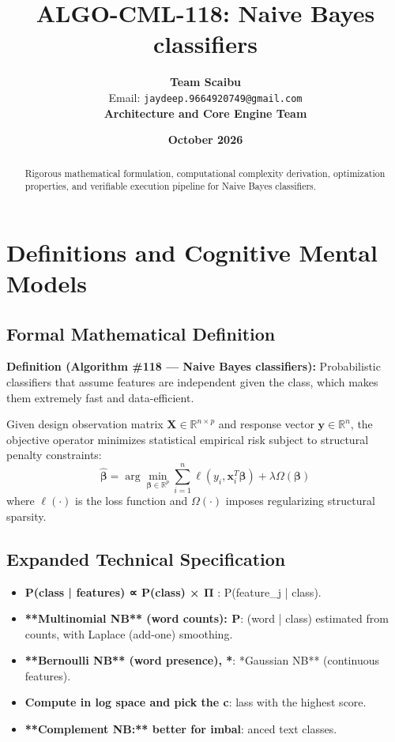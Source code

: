 \documentclass[11pt,a4paper]{article}
\title{\textbf{ALGO-CML-118: Naive Bayes classifiers}}
\author{\textbf{Team Scaibu} \\ \small Email: \texttt{jaydeep.9664920749@gmail.com} \\ \small \textbf{Architecture and Core Engine Team}}
\date{\textbf{October 2026}}
\theoremstyle{definition}
\begin{document}
\maketitle

\begin{abstract}
Rigorous mathematical formulation, computational complexity derivation, optimization properties, and verifiable execution pipeline for Naive Bayes classifiers.
\end{abstract}

\section{Definitions and Cognitive Mental Models}

\subsection{Formal Mathematical Definition}
\textbf{Definition (Algorithm \#118 --- Naive Bayes classifiers):}
Probabilistic classifiers that assume features are independent given the class, which makes them extremely fast and data-efficient.

Given design observation matrix $\mathbf{X} \in \mathbb{R}^{n \times p}$ and response vector $\mathbf{y} \in \mathbb{R}^n$, the objective operator minimizes statistical empirical risk subject to structural penalty constraints:
\begin{equation}
\hat{\boldsymbol{\beta}} = \arg\min_{\boldsymbol{\beta} \in \mathbb{R}^p} \sum_{i=1}^n \ell(y_i, \mathbf{x}_i^T \boldsymbol{\beta}) + \lambda \Omega(\boldsymbol{\beta})
\end{equation}
where $\ell(\cdot)$ is the loss function and $\Omega(\cdot)$ imposes regularizing structural sparsity.

\subsection{Expanded Technical Specification}
\begin{itemize}
\item \textbf{P(class | features) ∝ P(class) × Π }: P(feature\_j | class).
\item \textbf{**Multinomial NB** (word counts): P}: (word | class) estimated from counts, with Laplace (add-one) smoothing.
\item \textbf{**Bernoulli NB** (word presence), *}: *Gaussian NB** (continuous features).
\item \textbf{Compute in log space and pick the c}: lass with the highest score.
\item \textbf{**Complement NB:** better for imbal}: anced text classes.
\end{itemize}
\end{document}
